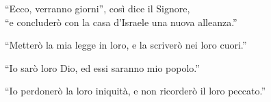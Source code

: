 

\spazio

\strofa ``Ecco, verranno giorni'', così dice il Signore,\\
``e concluderò con la casa d'Israele una nuova alleanza.''

\spazio


\spazio

\strofa ``Metterò la mia legge in loro, e la scriverò nei loro cuori.''

\spazio


\spazio

\strofa ``Io sarò loro Dio, ed essi saranno mio popolo.''

\spazio


\spazio

\strofa ``Io perdonerò la loro iniquità, e non ricorderò il loro peccato.''

\spazio

